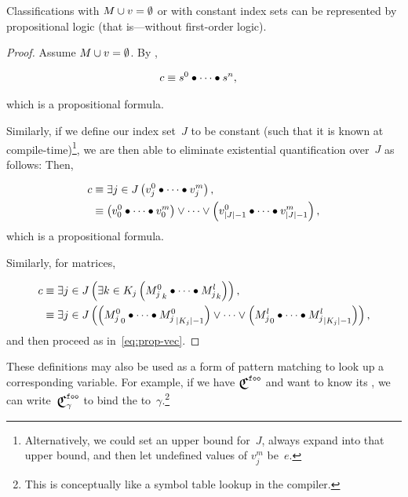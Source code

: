 \begin{corollary}
  Classifications with $M\cup v=\emptyset$ or with constant index sets can
    be represented by propositional logic
      (that is---without first-order logic).
\end{corollary}
\begin{proof}
  Assume $M\cup v=\emptyset$.
  By ,

  \begin{align*}
    c &\equiv s^0\bullet\cdots\bullet s^n,
  \end{align*}

  \noindent
  which is a propositional formula.

  Similarly,
    if we define our index set~$J$ to be constant
      (such that it is known at compile-time)\footnote{%
        Alternatively,
          we could set an upper bound for~$J$,
          always expand into that upper bound,
          and then let undefined values of $v^m_j$ be~$e$.},
        we are then able to eliminate existential quantification over~$J$
        as follows:
  Then,

  \begin{align}\label{eq:prop-vec}
    c &\equiv \Exists{j\in J}{\cpredvecseq}, \nonumber\\
      &\equiv \left(v^0_0\bullet\cdots\bullet v^m_0\right)
              \lor\cdots\lor
              \left(v^0_{|J|-1}\bullet\cdots\bullet v^m_{|J|-1}\right),
  \end{align}
  \noindent
  which is a propositional formula.

  Similarly,
    for matrices,

  \begin{align}
    c &\equiv \Exists{j\in J}{\Exists{k\in K_j}{\cpredmatseq}}, \nonumber\\
      &\equiv \Exists{j\in J}{
                \left({M^0_j}_0\bullet\cdots\bullet{M^0_j}_{|K_j|-1}\right)
                \lor\cdots\lor
                \left({M^l_j}_0\bullet\cdots\bullet{M^l_j}_{|K_j|-1}\right)
              },
  \end{align}
  \noindent
  and then proceed as in~\ref{eq:prop-vec}.
\end{proof}


These definitions may also be used as a form of pattern matching to look up
  a corresponding variable.
For example,
  if we have $\Classify^\texttt{foo}$ and want to know its ,
    we can write~$\Classify^\texttt{foo}_\gamma$ to bind the
     to~$\gamma$.\footnote{%
      This is conceptually like a symbol table lookup in the compiler.}

